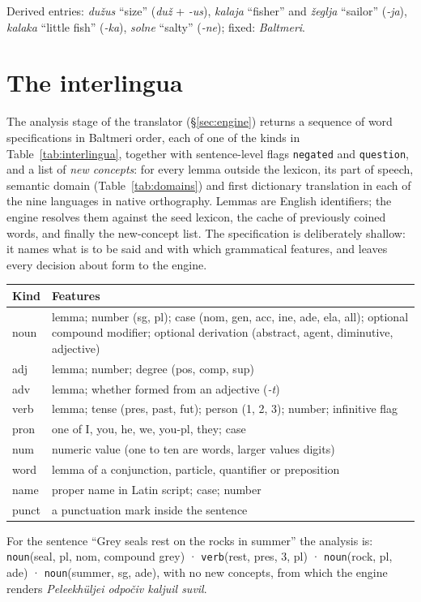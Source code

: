 Derived entries: \emph{dužus} ``size'' (\emph{duž} + \emph{-us}), \emph{kalaja} ``fisher'' and \emph{žeglja} ``sailor'' (\emph{-ja}), \emph{kalaka} ``little fish'' (\emph{-ka}), \emph{solne} ``salty'' (\emph{-ne}); fixed: \emph{Baltmeri}.

\section{The interlingua}\label{app:interlingua}
The analysis stage of the translator (\S\ref{sec:engine}) returns a sequence of word specifications in Baltmeri order, each of one of the kinds in Table~\ref{tab:interlingua}, together with sentence-level flags \texttt{negated} and \texttt{question}, and a list of \emph{new concepts}: for every lemma outside the lexicon, its part of speech, semantic domain (Table~\ref{tab:domains}) and first dictionary translation in each of the nine languages in native orthography. Lemmas are English identifiers; the engine resolves them against the seed lexicon, the cache of previously coined words, and finally the new-concept list. The specification is deliberately shallow: it names what is to be said and with which grammatical features, and leaves every decision about form to the engine.

\begin{center}\small
{}
\label{tab:interlingua}
\begin{tabular}{@{}lp{5.3cm}@{}}
\toprule
Kind & Features \\
\midrule
noun & lemma; number (sg, pl); case (nom, gen, acc, ine, ade, ela, all); optional compound modifier; optional derivation (abstract, agent, diminutive, adjective) \\
adj & lemma; number; degree (pos, comp, sup) \\
adv & lemma; whether formed from an adjective (\emph{-t}) \\
verb & lemma; tense (pres, past, fut); person (1, 2, 3); number; infinitive flag \\
pron & one of I, you, he, we, you-pl, they; case \\
num & numeric value (one to ten are words, larger values digits) \\
word & lemma of a conjunction, particle, quantifier or preposition \\
name & proper name in Latin script; case; number \\
punct & a punctuation mark inside the sentence \\
\bottomrule
\end{tabular}
\end{center}

For the sentence ``Grey seals rest on the rocks in summer'' the analysis is: \texttt{noun}(seal, pl, nom, compound grey) · \texttt{verb}(rest, pres, 3, pl) · \texttt{noun}(rock, pl, ade) · \texttt{noun}(summer, sg, ade), with no new concepts, from which the engine renders \emph{Peleekhüljei odpočiv kaljuil suvil}.
